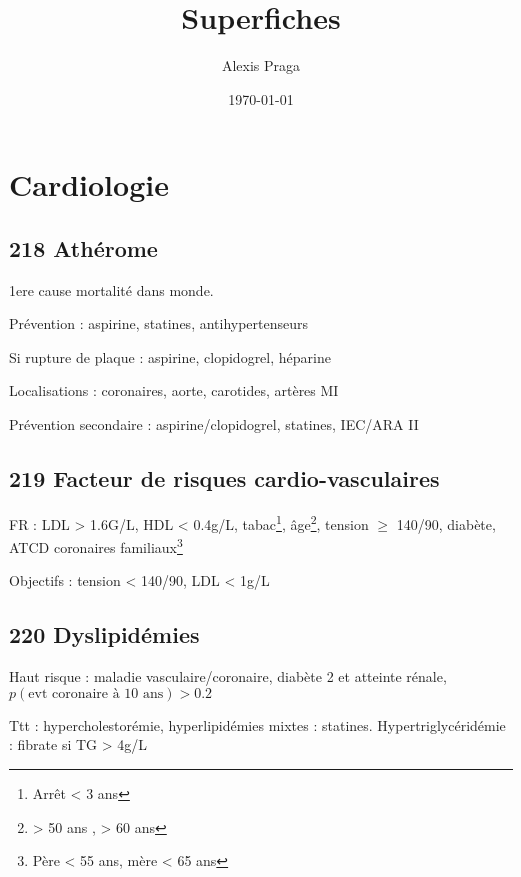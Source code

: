 \documentclass[11pt]{article}
\author{Alexis Praga}
\date{\today}
\title{Superfiches}
\begin{document}
\maketitle
\tableofcontents

\section{Cardiologie}
\label{sec:org5c83cd6}
\subsection{218 Athérome}
\label{sec:orgda1e747}
1ere cause mortalité dans monde.

Prévention : aspirine, statines, antihypertenseurs

Si rupture de plaque : aspirine, clopidogrel, héparine 

Localisations : coronaires, aorte, carotides, artères MI

Prévention secondaire : aspirine/clopidogrel, statines, IEC/ARA II

\subsection{219 Facteur de risques cardio-vasculaires}
\label{sec:orga0f0f1b}
FR : LDL > 1.6G/L, HDL < 0.4g/L, tabac\footnote{Arrêt < 3 ans}, âge\footnote{> 50 ans \male{}, > 60 ans \female{}}, tension \(\ge\) 140/90, diabète, ATCD
coronaires familiaux\footnote{Père < 55 ans, mère < 65 ans}

Objectifs : tension < 140/90, LDL < 1g/L
\subsection{220 Dyslipidémies}
\label{sec:org1f552b3}
Haut risque : maladie vasculaire/coronaire, diabète 2 et atteinte rénale,
\(p(\text{evt coronaire à 10 ans}) > 0.2\)

Ttt : hypercholestorémie, hyperlipidémies mixtes : statines. Hypertriglycéridémie : fibrate si TG > 4g/L
\end{document}

